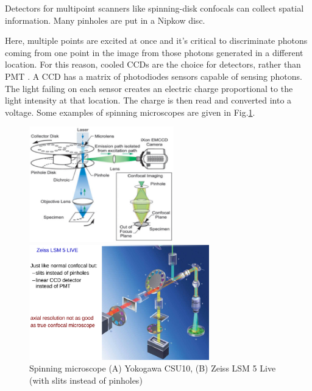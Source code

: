 Detectors for multipoint scanners like spinning-disk confocals can collect
spatial information. Many pinholes are put in a Nipkow disc.


Here, multiple points are excited at once and it's critical
to discriminate photons coming from one point in the image from those photons
generated in a different location. For this reason, cooled CCDs are the choice
for detectors, rather than PMT \citep{jerome2011dic}. A CCD has a matrix of
photodiodes sensors capable of sensing photons. The light failing on each sensor
creates an electric charge proportional to the light intensity at that location.
The charge is then read and converted into a voltage. Some examples of spinning
microscopes are given in Fig.\ref{fig:spinning_microscope}. 

\begin{figure}[hbt]
  \centerline{
    \includegraphics[height=5cm,
    angle=0]{./images/LSCM_spinningdisc.eps}}
      \centerline{\includegraphics[height=5cm,
    angle=0]{./images/spinningdisk_microscope2.eps}}    
  \caption{Spinning microscope (A) Yokogawa CSU10, (B) Zeiss LSM 5 Live (with
  slits instead of pinholes)}
  \label{fig:spinning_microscope}
\end{figure}

